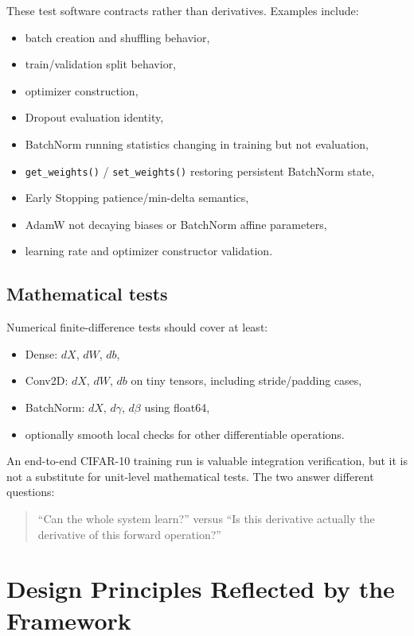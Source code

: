 \documentclass[11pt,a4paper]{article}
\newcommand{\code}[1]{\texttt{#1}}
\begin{document}
These test software contracts rather than derivatives. Examples include:
\begin{itemize}
    \item batch creation and shuffling behavior,
    \item train/validation split behavior,
    \item optimizer construction,
    \item Dropout evaluation identity,
    \item BatchNorm running statistics changing in training but not evaluation,
    \item \code{get\_weights()} / \code{set\_weights()} restoring persistent BatchNorm state,
    \item Early Stopping patience/min-delta semantics,
    \item AdamW not decaying biases or BatchNorm affine parameters,
    \item learning rate and optimizer constructor validation.
\end{itemize}

\subsection{Mathematical tests}

Numerical finite-difference tests should cover at least:
\begin{itemize}
    \item Dense: $dX$, $dW$, $db$,
    \item Conv2D: $dX$, $dW$, $db$ on tiny tensors, including stride/padding cases,
    \item BatchNorm: $dX$, $d\gamma$, $d\beta$ using float64,
    \item optionally smooth local checks for other differentiable operations.
\end{itemize}

An end-to-end CIFAR-10 training run is valuable integration verification, but it is not a substitute for unit-level mathematical tests. The two answer different questions:
\begin{quote}
``Can the whole system learn?'' versus ``Is this derivative actually the derivative of this forward operation?''
\end{quote}

\section{Design Principles Reflected by the Framework}
\end{document}
